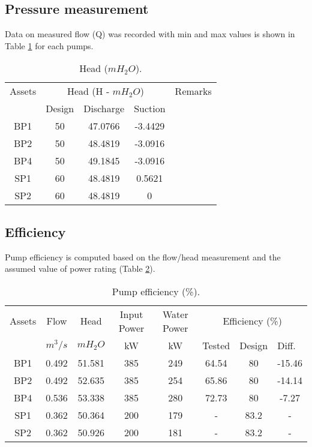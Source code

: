\subsection{Pressure measurement} \label{ch04pressure}

Data on measured flow (Q) was recorded with min and max values is shown in Table \ref{ch04_tbl_flow02} for each pumps. %

\begin{table}[!h]
	\caption{Head ($mH_2O$).}
	\label{ch04_tbl_flow02}
	{\footnotesize
\begin{tabular}{c|c|c|c|l}
\hline
Assets & \multicolumn{3}{c|}{Head (H - $mH_2O$)} & Remarks \\ 
\cline{2-4}
 & Design & Discharge & Suction &  \\ 
\hline
BP1 & 50 & 47.0766 & -3.4429 &  \\ 
BP2 & 50 & 48.4819 & -3.0916 &  \\ 
BP4 & 50 & 49.1845 & -3.0916 &  \\ 
SP1 & 60 & 48.4819 & 0.5621 &  \\ 
SP2 & 60 & 48.4819 & 0 &  \\ 
\hline
\end{tabular}

	}
\end{table}


\subsection{Efficiency}

Pump efficiency is computed based on the flow/head measurement and the assumed value of power rating (Table \ref{ch05_tbl_efficiency}). 
\begin{table}[!h]
	\caption{Pump efficiency (\%).}
	\label{ch05_tbl_efficiency}
	{\footnotesize
\begin{tabular}{c|c|c|c|c|c|l|l}
	\hline
Assets & Flow & Head & Input Power & Water Power & \multicolumn{3}{c}{Efficiency (\%)} \\ 
\cline{6-8}
 & $m^3/s$ & $mH_2O$ & kW & kW & Tested & Design & Diff. \\ 
\hline
BP1 & 0.492 & 51.581 & 385 & 249 & 64.54 & \multicolumn{1}{c|}{80} & \multicolumn{1}{c}{-15.46} \\ 
BP2 & 0.492 & 52.635 & 385 & 254 & 65.86 & \multicolumn{1}{c|}{80} & \multicolumn{1}{c}{-14.14} \\ 
BP4 & 0.536 & 53.338 & 385 & 280 & 72.73 & \multicolumn{1}{c|}{80} & \multicolumn{1}{c}{-7.27} \\ 
SP1 & 0.362 & 50.364 & 200 & 179 & - & \multicolumn{1}{c|}{83.2} & \multicolumn{1}{c}{-} \\ 
SP2 & 0.362 & 50.926 & 200 & 181 & - & \multicolumn{1}{c|}{83.2} & \multicolumn{1}{c}{-} \\ 
\hline
\end{tabular}

	}
\end{table}

